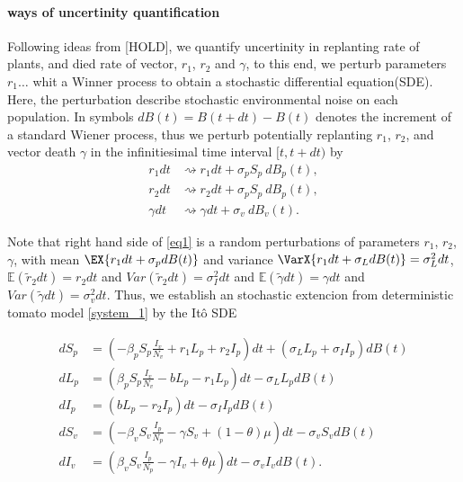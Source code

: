 \paragraph{ways of uncertinity quantification}

	Following ideas from [HOLD], we quantify uncertinity in replanting rate of
plants, and  died rate of vector, $r_1$, $r_2$ and $\gamma$, to this end, we
perturb parameters   $r_1 \dots$ whit a Winner
process to obtain a stochastic differential equation(SDE). Here, the 
perturbation describe stochastic environmental noise on each population. In
symbols $ dB(t)=B(t+dt)-B(t)$ denotes the increment of a standard Wiener
process, thus we perturb potentially replanting $r_1$, $r_2$, and vector death
$\gamma$ in the infinitiesimal time interval $[t, t + dt)$ by
\begin{equation}
	\label{eq1}
	\begin{aligned}
		{r}_1 dt &\rightsquigarrow r_1 dt + \sigma_p  S_p \ dB_p(t),
		\\
		{r}_2 dt &\rightsquigarrow r_2 dt + \sigma_p S_p \ dB_p(t),
		\\
		\gamma dt &\rightsquigarrow \gamma dt + \sigma_v \ dB_v(t).
	\end{aligned}
\end{equation}

	Note that right hand side of \eqref{eq1} is a random perturbations of parameters
$r_1$, $r_2$, $\gamma$, with mean
$
	\EX{r_1 dt + \sigma_p dB(t)}
$
and variance 
$
	\VarX{r_1 dt + \sigma_L dB(t)} = \sigma_L^2dt
$, 
$
	\mathbb{E}(\tilde{r}_2dt) = r_2dt
$ 
and
$
	Var(\tilde{r}_2dt) = \sigma_I^2dt
$ 
and 
$
	\mathbb{E}(\tilde{\gamma}dt) = \gamma dt
$ and 
$
	Var(\tilde{\gamma}dt) = \sigma_v^2dt
$.
%
Thus, we establish an stochastic extencion from deterministic tomato model 
\eqref{system_1} by the It\^{o} SDE

\begin{equation}
	\label{system_3}
	\begin{aligned}
		d S_p &=
			\left(
				-\beta_p S_p \frac{I_v}{N_v} + r_1 L_p + r_2 I_p
			\right)dt 
			+ (\sigma_L L_p
			+ 
			\sigma_I I_p)dB(t) 
		\\
		dL_p &=
			\left(
				\beta_p S_p \frac{I_v}{N_v} - b L_p - r_1 L_p
			\right) dt 
			- \sigma_L L_p dB(t) 
		\\
		d I_p &=
			\left(
				b L_p - r_2 I_p
			\right) dt 
			- \sigma_I I_p dB(t) 
		\\
		dS_v &=
			\left(
				-\beta_v S_v \frac{I_p}{N_p} - \gamma S_v  + (1-\theta) \mu
			\right)dt - \sigma_v S_v dB(t) 
		\\
		d I_v &=
			\left(
				\beta_v S_v \frac{I_p}{N_p} -\gamma I_v + \theta \mu
			\right) dt 
			- \sigma_v I_v dB(t).
	\end{aligned}
\end{equation}